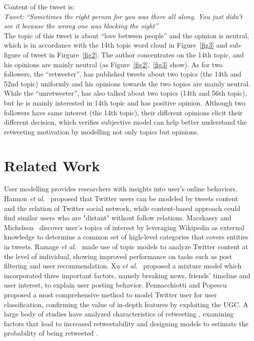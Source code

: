 \documentclass[letterpaper]{article}
\begin{document}
Content of the tweet is:\\
\textit{Tweet: ``Sometimes the right person for you was there all along. You just didn’t see it because the wrong one was blocking the sight''} \\
The topic of this tweet is about ``love between people'' and the opinion is neutral, which is in accordance with the 14th topic word cloud in Figure~\ref{fig3} and sub-figure of tweet in Firgure~\ref{fig2}.
The author concentrates on the 14th topic, and his opinions are mainly neutral (as Figure~\ref{fig2},~\ref{fig3} show).
As for two followers, the ``retweeter'', has published tweets about two topics (the 14th and 52nd topic) uniformly and his opinions towards the two topics are mainly neutral.
While the ``unretweeter'', has also talked about two topics (14th and 56th topic), but he is mainly interested in 14th topic and has positive opinion.
Although two followers have same interest (the 14th topic), their different opinions elicit their different decision, which verifies subjective model can help better understand the retweeting motivation by modelling not only topics but opinions.

\section{Related Work}
\label{relatedwork}
   
User modelling provides researchers with insights into user's online behaviors. 
Hannon \emph{et al.}~ proposed that Twitter users can be modeled by tweets content and the relation of Twitter social network, while content-based approach could find similar users who are "distant" without follow relations. 
Macskassy and Michelson~ discover user's topics of interest by leveraging Wikipedia as external knowledge to determine a common set of high-level categories that covers entities in tweets. 
Ramage \emph{et al.}~ made use of topic models to analyze Twitter content at the level of individual, showing improved performance on tasks such as post filtering and user recommendation. 
Xu \emph{et al.}~ proposed a mixture model which incorporated three important factors, namely breaking news, friends' timeline and user interest, to explain user posting behavior.
Pennacchiotti and Popescu~ proposed a most comprehensive method to model Twitter user for user classification, confirming the value of in-depth features by exploiting the UGC.
A large body of studies have analyzed characteristics of retweeting \cite{conf/icwsm/MacskassyM11,Starbird:2012RRI}, examining factors that lead to increased retweetability \cite{Suh2010,Comarela:2012UFA} and designing models to estimate the probability of being retweeted \cite{Osborne_Lavrenko_2011,Jenders:2013APV,conf/icwsm/PfitznerGS12}.
\end{document}
